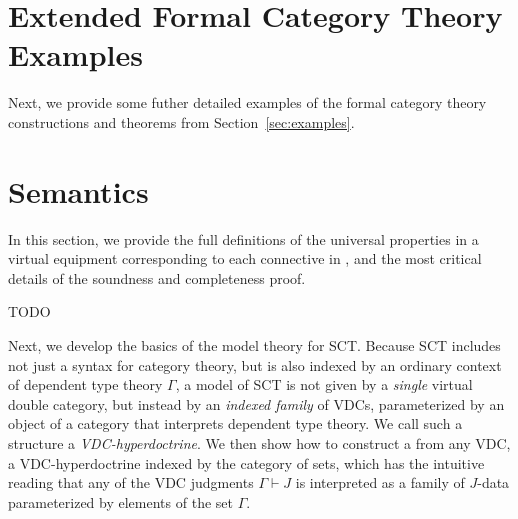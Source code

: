\documentclass{llncs}
\begin{document}

  




\section{Extended Formal Category Theory Examples}
\label{sec:appendix:examples}

Next, we provide some futher detailed examples of the formal category
theory constructions and theorems from Section~\ref{sec:examples}.

\section{Semantics}
\label{sec:appendix:semantics}

In this section, we provide the full definitions of the universal
properties in a virtual equipment corresponding to each connective in
\vett{}, and the most critical details of the soundness and
completeness proof.

TODO

Next, we develop the basics of the model theory for SCT. Because SCT
includes not just a syntax for category theory, but is also indexed by
an ordinary context of dependent type theory $\Gamma$, a model of SCT
is not given by a \emph{single} virtual double category, but instead
by an \emph{indexed family} of VDCs, parameterized by an object of a
category that interprets dependent type theory. We call such a
structure a \emph{VDC-hyperdoctrine}. We then show how to construct a
from any VDC, a VDC-hyperdoctrine indexed by the category of sets,
which has the intuitive reading that any of the VDC judgments $\Gamma
\vdash J$ is interpreted as a family of $J$-data parameterized
by elements of the set $\Gamma$.
\end{document}

